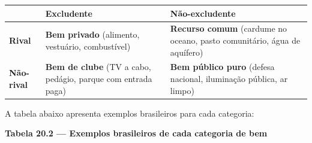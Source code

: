 \documentclass[11pt,twoside,openright]{book}
\begin{document}
{\def\LTcaptype{none} %
\begin{longtable}[]{@{}
  >{\raggedright\arraybackslash}p{}
  >{\raggedright\arraybackslash}p{}
  >{\raggedright\arraybackslash}p{}@{}}
\toprule\noalign{}
\begin{minipage}[b]{\linewidth}\raggedright
\end{minipage} & \begin{minipage}[b]{\linewidth}\raggedright
\textbf{Excludente}
\end{minipage} & \begin{minipage}[b]{\linewidth}\raggedright
\textbf{Não-excludente}
\end{minipage} \\
\midrule\noalign{}
\endhead
\bottomrule\noalign{}
\endlastfoot
\textbf{Rival} & \textbf{Bem privado} (alimento, vestuário, combustível)
& \textbf{Recurso comum} (cardume no oceano, pasto comunitário, água de
aquífero) \\
\textbf{Não-rival} & \textbf{Bem de clube} (TV a cabo, pedágio, parque
com entrada paga) & \textbf{Bem público puro} (defesa nacional,
iluminação pública, ar limpo) \\
\end{longtable}
}

A tabela abaixo apresenta exemplos brasileiros para cada categoria:

\textbf{Tabela 20.2 --- Exemplos brasileiros de cada categoria de bem}
\end{document}
